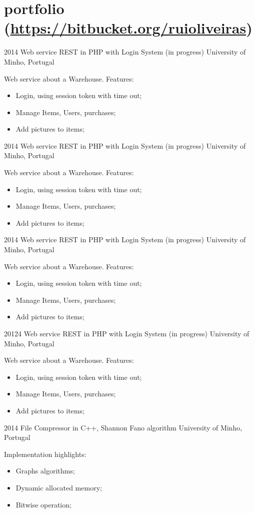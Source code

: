 \documentclass[]{friggeri-cv} %
\begin{document}
\section{portfolio {\normalfont \normalsize (\href{https://bitbucket.org/ruioliveiras}{https://bitbucket.org/ruioliveiras})}}
\begin{entrylist}


\entry
{2014}
{Web service REST in PHP with Login System {\normalfont(in progress)}}
{University of Minho, Portugal}
{Web service about a Warehouse. Features: 
\begin{itemize} 
    \item Login, using session token with time out;
    \item Manage Items, Users, purchases;
    \item Add pictures to items;
\end{itemize}
}
\entry
{2014}
{Web service REST in PHP with Login System {\normalfont(in progress)}}
{University of Minho, Portugal}
{Web service about a Warehouse. Features: 
\begin{itemize} 
    \item Login, using session token with time out;
    \item Manage Items, Users, purchases;
    \item Add pictures to items;
\end{itemize}
}
{2014}
{Web service REST in PHP with Login System {\normalfont(in progress)}}
{University of Minho, Portugal}
{Web service about a Warehouse. Features: 
\begin{itemize} 
    \item Login, using session token with time out;
    \item Manage Items, Users, purchases;
    \item Add pictures to items;
\end{itemize}
}


\entry
{20124}
{Web service REST in PHP with Login System {\normalfont(in progress)}}
{University of Minho, Portugal}
{Web service about a Warehouse. Features: 
\begin{itemize} 
	\item Login, using session token with time out;
	\item Manage Items, Users, purchases;
	\item Add pictures to items;
\end{itemize}
}

\entry
{2014}
{File Compressor in C++, Shannon Fano algorithm}
{University of Minho, Portugal}
{Implementation highlights:
\begin{itemize} 
	\item Graphs algorithms;
	\item Dynamic allocated memory;
	\item Bitwise operation;
\end{itemize}
}
\end{entrylist}
\end{document}

